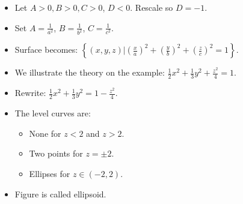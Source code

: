\begin{frame}
\begin{columns}
\begin{itemize}
\item Let $A>0, B>0, C>0$, $D<0$. Rescale so $D=-1$.
\item<2-> Set $A=\frac{1}{a^2}$, $B=\frac{1}{b^2}$, $C=\frac{1}{c^2}$.
\item<3-> Surface becomes:
$\left\{(x,y,z)|\left(\frac{x}{a}\right)^2+\left(\frac{y}{b}\right)^2+\left(\frac{z}{c}\right)^2= 1\right\}$.
\item<4-> We illustrate the theory on the example:
$\frac{1}{2}x^2+\frac{1}{3}y^2+\frac{z^2}{4}=1$.
\item<5-> Rewrite:
$\frac{1}{2}x^2+\frac{1}{3}y^2=1-\frac{z^2}{4}$.
\item<5-> The level curves are:
\begin{itemize}
\item<7-> None for $z<2$ and $z>2$.
\item<9-> Two points for $z=\pm 2$.
\item<11-> Ellipses for $z\in (-2,2)$. 
\end{itemize}
\item<18> Figure is called ellipsoid.
\end{itemize}

\end{columns}

\vskip 10cm

\end{frame}